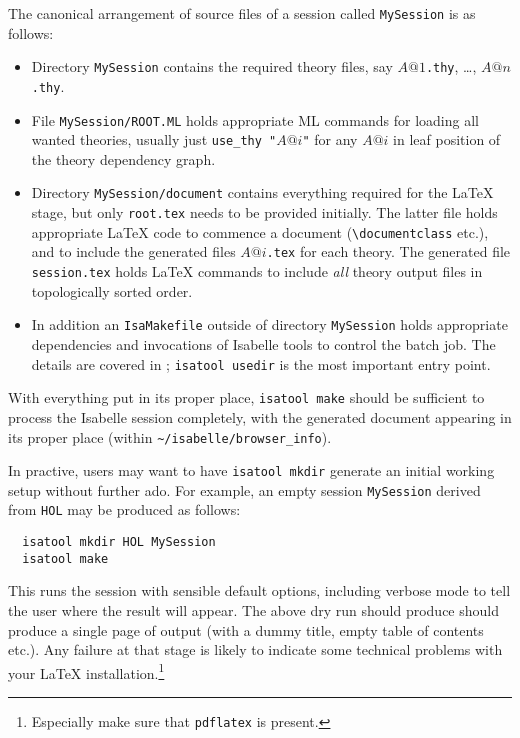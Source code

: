 \begin{isabellebody}
\begin{isamarkuptext}
  The canonical arrangement of source files of a session called
  \texttt{MySession} is as follows:

  \begin{itemize}

  \item Directory \texttt{MySession} contains the required theory
  files, say $A@1$\texttt{.thy}, \dots, $A@n$\texttt{.thy}.

  \item File \texttt{MySession/ROOT.ML} holds appropriate ML commands
  for loading all wanted theories, usually just
  \texttt{use_thy~"$A@i$"} for any $A@i$ in leaf position of the
  theory dependency graph.

  \item Directory \texttt{MySession/document} contains everything
  required for the {\LaTeX} stage, but only \texttt{root.tex} needs to
  be provided initially.  The latter file holds appropriate {\LaTeX}
  code to commence a document (\verb,\documentclass, etc.), and to
  include the generated files $A@i$\texttt{.tex} for each theory.  The
  generated file \texttt{session.tex} holds {\LaTeX} commands to
  include \emph{all} theory output files in topologically sorted
  order.

  \item In addition an \texttt{IsaMakefile} outside of directory
  \texttt{MySession} holds appropriate dependencies and invocations of
  Isabelle tools to control the batch job.  The details are covered in
  \cite{isabelle-sys}; \texttt{isatool usedir} is the most important
  entry point.

  \end{itemize}

  With everything put in its proper place, \texttt{isatool make}
  should be sufficient to process the Isabelle session completely,
  with the generated document appearing in its proper place (within
  \verb,~/isabelle/browser_info,).

  In practive, users may want to have \texttt{isatool mkdir} generate
  an initial working setup without further ado.  For example, an empty
  session \texttt{MySession} derived from \texttt{HOL} may be produced
  as follows:

\begin{verbatim}
  isatool mkdir HOL MySession
  isatool make
\end{verbatim}

  This runs the session with sensible default options, including
  verbose mode to tell the user where the result will appear.  The
  above dry run should produce should produce a single page of output
  (with a dummy title, empty table of contents etc.).  Any failure at
  that stage is likely to indicate some technical problems with your
  {\LaTeX} installation.\footnote{Especially make sure that
  \texttt{pdflatex} is present.}


\end{isamarkuptext}
\end{isabellebody}

